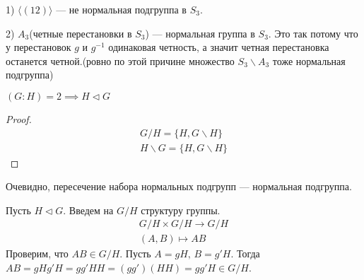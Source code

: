 \documentclass[../main.tex]{subfiles}
\begin{document}
\begin{examples}
    1) $\langle (1 2) \rangle$ --- не нормальная подгруппа в $S_3$.

    2) $A_3$(четные перестановки в $S_3$) --- нормальная группа в $S_3$. Это так потому что у перестановок $g$ и $g^{-1}$ одинаковая четность, а значит четная перестановка останется четной.(ровно по этой причине множество $S_3 \backslash A_3$ тоже нормальная подгруппа)
\end{examples}
\begin{remark}
    $(G : H) = 2 \implies H \triangleleft G$
\end{remark}
\begin{proof}
    \begin{equation*}
        \begin{gathered}
            G / H = \{H, G \backslash H\}\\
            H \backslash G = \{H, G \backslash H\}
        \end{gathered}
    \end{equation*}
\end{proof}

\begin{remark}
Очевидно, пересечение набора нормальных подгрупп --- нормальная подгруппа.
\end{remark}

Пусть $H \triangleleft G$. Введем на $G / H$ структуру группы.
\begin{equation*}
    \begin{gathered}
        G/H \times G/H \to G/H \\
        (A, B) \mapsto AB
    \end{gathered}
\end{equation*}
Проверим, что $AB \in G/H$. Пусть $A = gH, \, B = g'H$. Тогда $AB = gHg'H = gg'HH = (gg')(HH) = gg'H \in G/H$.
\end{document}
